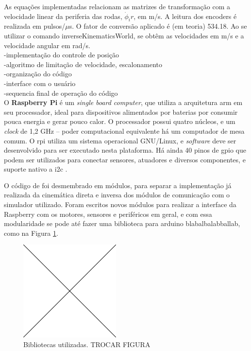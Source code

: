 As equações implementadas relacionam as matrizes de transformação com a velocidade linear da periferia das rodas, $\dot{\phi}_i r$, em m/s. A leitura dos encoders é realizada em pulsos/$\mu$s. O fator de conversão aplicado é (em teoria) 534.18. Ao se utilizar o comando inverseKinematicsWorld, se obtêm as velocidades em m/s e a velocidade angular em rad/s. \\
-implementação do controle de posição \\
-algoritmo de limitação de velocidade, escalonamento \\
-organização do código \\
-interface com o usuário \\
-sequencia final de operação do código \\

O \textbf{Raspberry Pi} é um \emph{single board computer}, que utiliza a arquitetura \acrshort{arm} em seu processador, ideal para dispositivos alimentados por baterias por consumir pouca energia e gerar pouco calor. O processador possui quatro núcleos, e um \emph{clock} de 1,2 GHz -- poder computacional equivalente há um computador de mesa comum. O \acrshort{rpi} utiliza um sistema operacional GNU/Linux, e \emph{software} deve ser desenvolvido para ser executado nesta plataforma. Há ainda 40 pinos de \acrshort{gpio} que podem ser utilizados para conectar sensores, atuadores e diversos componentes, e suporte nativo a \acrshort{i2c} \citep{upton2014raspberry}.

O código de \citet{ritter2016modelagem} foi desmembrado em módulos, para separar a implementação já realizada da cinemática direta e inversa dos módulos de comunicação com o simulador utilizado. Foram escritos novos módulos para realizar a interface da Raspberry com os motores, sensores e periféricos em geral, e com essa modularidade se pode até fazer uma biblioteca para arduino blabalbalabballab, como na Figura \ref{fig:libs}.

\begin{figure}[h]
  \centering
  \includegraphics[width = 0.45\textwidth]{imagens/edc}
  \caption{Bibliotecas utilizadas. TROCAR FIGURA}
  \label{fig:libs}
\end{figure}

